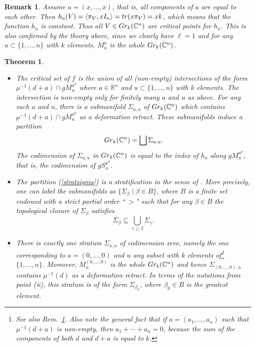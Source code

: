 \documentclass[10pt,a4paper]{amsart}
\newtheorem{rem}{Remark}
\newtheorem{thm}{Theorem}
\newcommand{\CC}{\mathbb C}
\newcommand{\RR}{\mathbb R}
\begin{document}
\begin{rem} \label{unif} Assume $a=(x, \ldots, x)$, that is, all components of $a$ are equal to each other. Then 
$h_a(V) = \langle \pi_V, x{\rm I}_n\rangle = {\rm tr}(x\pi_V)=xk$, which means that the function $h_a$ is constant. 
Thus all $V\in {\rm Gr}_k(\CC^n)$ are critical points for $h_a$. This is also confirmed by the theory above, since 
we clearly have $\ell =1$ and for any $u\subset \{1, \ldots, n\}$ with $k$ elements, $M_u^a$ is the whole 
${\rm Gr}_k(\CC^n)$. 
\end{rem}

\begin{thm}\label{stratif} \begin{itemize} 
\item[(i)] The critical set of $f_{}$ is the union of all (non-empty) intersections of the form
$\mu^{-1}(d+a) \cap gM_{u}^{{a}^\sigma}$ where $a\in \RR^n$  and $u\subset \{1, \ldots, n\}$ with $k$ elements.
The intersection is non-empty  only for finitely many  $a$ and $u$ as above. For any such $a$ and $u$, there is a submanifold
$\Sigma_{a, u}$  of ${\rm Gr}_k(\CC^n)$ which contains $\mu^{-1}(d+a) \cap gM_{u}^{{a}^\sigma}$
as a deformation retract. These submanifolds induce a partition 
\begin{equation}\label{stratsigma}{\rm Gr}_k(\CC^n)= \bigsqcup \Sigma_{a, u}.\end{equation}
The codimension of $\Sigma_{a,u}$ in
${\rm Gr}_k(\CC^n)$ is equal to the index of $h_a$ along $gM_{u}^{{a}^\sigma}$, that is, the codimension of
$gS_{u}^{a^\sigma}$.
\item[(ii)] The partition (\ref{stratsigma}) is a stratification in the sense of \cite[Def.~2.11]{Ki}. More precisely, one can label the submanifolds as $\{\Sigma_\beta  \mid \beta\in B\}$, where $B$ is a finite set endowed with a strict partial order ``$ \ >$" such that for any $\beta \in B$ the topological closure of $\Sigma_\beta$ satisfies
\begin{equation}\label{osig} \overline{\Sigma}_\beta \subseteq \bigcup_{\gamma \ge \beta} \Sigma_\gamma.\end{equation} 
\item[(iii)] There is exactly one stratum $\Sigma_{a,u}$ of codimension zero, namely 
the one corresponding to $a=(0, \ldots, 0)$ 
and $u$  any subset with $k$ elements of\footnote{See also Rem.~\ref{unif}. Also note the general fact that if $a=(a_1, \ldots, a_n)$ such that $\mu^{-1}(d+a)$ is non-empty, then $a_1+\cdots + a_n=0$, because the sum of the components of both $d$ and $d+a$ is equal to $k$.}
$\{1, \ldots, n\}$.  Moreover,  $M_{u}^{(0, \ldots, 0)}$ is the whole ${\rm Gr}_k(\CC^n)$ and hence 
$\Sigma_{(0, \ldots, 0),u}$ contains $\mu^{-1}(d)$ as a deformation retract. In terms of the notations from point (ii), this stratum is of the form $\Sigma_{\beta_0}$, where $\beta_0\in B$ is the greatest element.
\end{itemize} 
\end{thm} 
\end{document}
